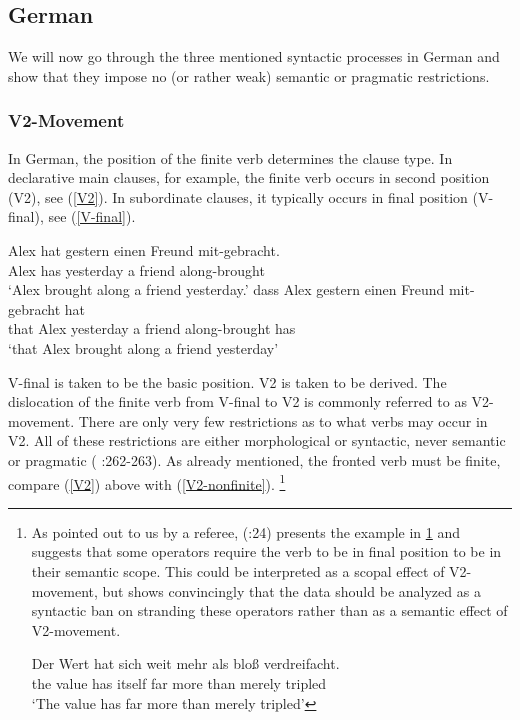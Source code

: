 \documentclass[output=paper]{langsci/langscibook}
\begin{document}
\subsection{German}
\label{Sec-RestrictionsGerman}

We will now go through the three mentioned syntactic processes in German and show that they impose no (or rather weak) semantic or pragmatic restrictions.



\subsubsection{V2-Movement}

In German, the position of the finite verb determines the clause type. In declarative main clauses, for example, the finite verb occurs in second position (V2), see (\ref{V2}). In subordinate clauses, it typically occurs in final position (V-final), see (\ref{V-final}).


\ea
\ea\label{V2-vs.-V-final}
\gll Alex hat gestern einen Freund mit-gebracht. \\
Alex has yesterday a friend along-brought \\
\glt `Alex brought along a friend yesterday.' \label{V2}
\ex
\gll dass Alex gestern einen Freund mit-gebracht hat \\
that Alex yesterday a friend along-brought has \\
\glt `that Alex brought along a friend yesterday' \label{V-final}
\z
\z

V-final is taken to be the basic position. V2 is taken to be derived. The dislocation of the finite verb from V-final to V2 is commonly referred to as  V2-movement. There are only very few restrictions as to what verbs may occur in V2. All of these restrictions are either morphological or syntactic, never semantic or pragmatic (\citeauthor{Schenk:95} \citeyear{Schenk:95}:262-263). As already mentioned, the fronted verb must be finite, compare (\ref{V2}) above with (\ref{V2-nonfinite}).%
\footnote{As pointed out to us by a referee, \citeauthor{Haider:97} (\citeyear{Haider:97}:24) presents the example in \ref{verdrei} and suggests that some operators require the verb to be in final position to be in their semantic scope. This could be interpreted as a scopal effect of V2-movement, but \cite{Meinunger:01} shows convincingly that the data should be analyzed as a syntactic ban on stranding these operators rather than as a semantic effect of V2-movement.

\ea
\ea\label{verdrei}
\gll Der Wert hat sich weit mehr als blo{\ss} verdreifacht.\\
the value has itself far more than merely tripled\\
\glt `The value has far more than merely tripled'
\z
\z

}
\end{document}
